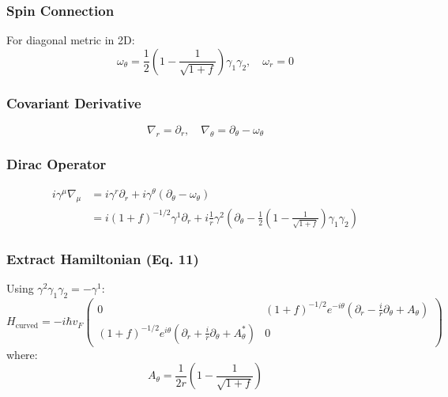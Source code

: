 \documentclass[12pt]{article}
\begin{document}
\subsubsection{Spin Connection}

For diagonal metric in 2D:
\begin{equation}
    \omega_\theta = \frac{1}{2} \left(1 - \frac{1}{\sqrt{1+f}}\right) \gamma_1 \gamma_2, \quad
    \omega_r = 0
\end{equation}

\subsubsection{Covariant Derivative}
\begin{equation}
    \nabla_r = \partial_r, \quad \nabla_\theta = \partial_\theta - \omega_\theta
\end{equation}

\subsubsection{Dirac Operator}
\begin{align}
    i\gamma^\mu \nabla_\mu &= i\gamma^r \partial_r + i\gamma^\theta (\partial_\theta - \omega_\theta) \\
    &= i(1+f)^{-1/2} \gamma^1 \partial_r + i\frac{1}{r} \gamma^2 \left(\partial_\theta - \frac{1}{2}\left(1 - \frac{1}{\sqrt{1+f}}\right) \gamma_1 \gamma_2\right)
\end{align}

\subsubsection{Extract Hamiltonian (Eq. 11)}

Using $\gamma^2 \gamma_1 \gamma_2 = -\gamma^1$:
\begin{equation}
    H_{\text{curved}} = -i\hbar v_F \begin{pmatrix}
    0 & (1+f)^{-1/2} e^{-i\theta}\left(\partial_r - \frac{i}{r}\partial_\theta + A_\theta\right) \\
    (1+f)^{-1/2} e^{i\theta}\left(\partial_r + \frac{i}{r}\partial_\theta + A_\theta^*\right) & 0
    \end{pmatrix}
    \tag{Eq. 11}
\end{equation}
where:
\begin{equation}
    A_\theta = \frac{1}{2r}\left(1 - \frac{1}{\sqrt{1+f}}\right)
    \tag{Eq. 12}
\end{equation}
\end{document}
